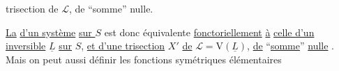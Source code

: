 trisection de $\mathcal L$, de ``somme'' nulle.

\uline{La}   \uline{d'un système}  \uline{}  \uline{sur $S$} est donc équivalente \uline{fonctoriellement} \uline{à} \uline{celle d'un} \uline{}  \uline{inversible}  $\underline L$ \uline{sur} $S$, \uline{et d'une trisection} $X'$  \uline{de} $\mathcal L=\mathrm V(\underline L)$, \uline{de}  ``\uline{somme}'' \uline{nulle}  . Mais on peut aussi définir les  fonctions symétriques élémentaires 


